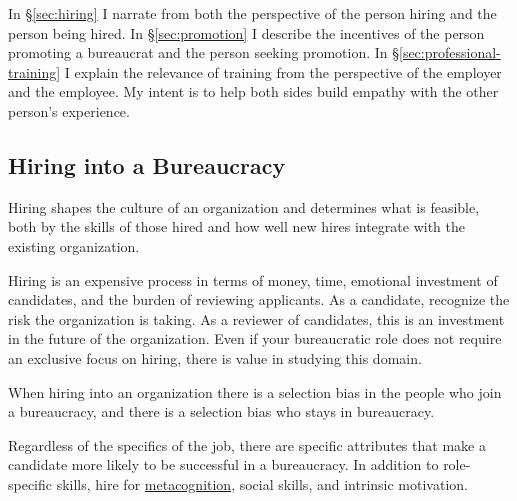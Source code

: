 In \S\ref{sec:hiring} I narrate from both the perspective of the person hiring and the person being hired. In \S\ref{sec:promotion} I describe the incentives of the person promoting a bureaucrat and the person seeking promotion. In \S\ref{sec:professional-training} I explain the relevance of training from the perspective of the employer and the employee. My intent is to help both sides build empathy with the other person's experience. 


\subsection{Hiring into a Bureaucracy\label{sec:hiring}}


Hiring shapes the culture of an organization and determines what is feasible, both by the skills of those hired and how well new hires integrate with the existing organization. 

Hiring is an expensive process in terms of money, time, emotional investment of candidates, and the burden of reviewing applicants. 
As a candidate, recognize the risk the organization is taking. 
As a reviewer of candidates, this is an investment in the future of the organization. Even if your bureaucratic role does not require an exclusive focus on hiring, there is value in studying this domain. 

When hiring into an organization there is a selection bias in the people who join a bureaucracy, and there is a selection bias who stays in bureaucracy. 


Regardless of the specifics of the job, there are specific attributes that make a candidate more likely to be successful in a bureaucracy. In addition to role-specific skills, hire for \href{https://en.wikipedia.org/wiki/Metacognition}{metacognition}, social skills, and intrinsic motivation.




